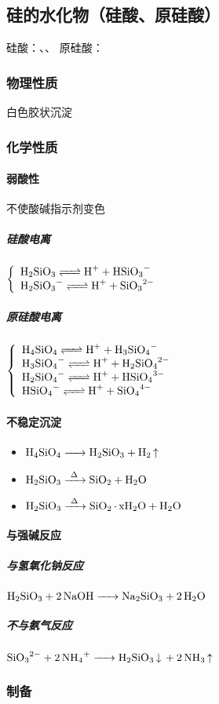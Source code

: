 \documentclass[a4paper]{article}
\begin{document}
	
	\subsection{硅的水化物（硅酸、原硅酸）}
	硅酸：、、
	原硅酸：
	\subsubsection{物理性质}
	白色胶状沉淀
	\subsubsection{化学性质}
	\paragraph{弱酸性}
	不使酸碱指示剂变色
	\subparagraph{硅酸电离}
	$\left\{\begin{array}{lr}
		\ce{H2SiO3 <=> H+ + HSiO3-}\\
		\ce{H2SiO3- <=> H+ + SiO3^2-}\\
	\end{array}\right.$
	\subparagraph{原硅酸电离}
	$\left\{\begin{array}{lr}
		\ce{H4SiO4 <=> H+ + H3SiO4-}\\
		\ce{H3SiO4- <=> H+ + H2SiO4^2-}\\
		\ce{H2SiO4- <=> H+ + HSiO4^3-}\\
		\ce{HSiO4- <=> H+ + SiO4^4-}\\
	\end{array}\right.$
	\paragraph{不稳定沉淀}
	\begin{itemize}
		\item $\ce{H4SiO4 -> H2SiO3 + H2 ^}$
		\item $\ce{H2SiO3 ->[\Delta] SiO2 + H2O}$
		\item $\ce{H2SiO3 ->[\Delta] SiO2*xH2O + H2O}$
	\end{itemize}
	\paragraph{与强碱反应}
	\subparagraph{与氢氧化钠反应}
	$\ce{H2SiO3 + 2NaOH -> Na2SiO3 + 2H2O}$
	\subparagraph{不与氨气反应}
	$\ce{SiO3^2- + 2NH4+ -> H2SiO3 v + 2NH3 ^}$
	\subsubsection{制备}
\end{document}
